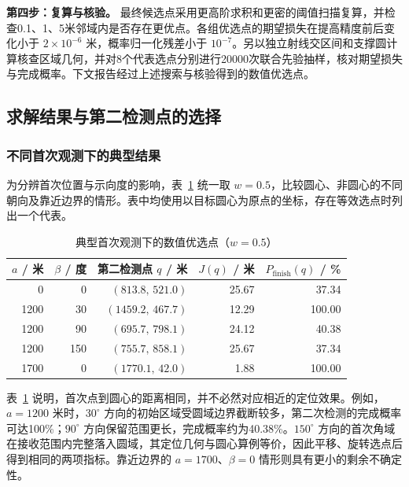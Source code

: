 \textbf{第四步：复算与核验。} 最终候选点采用更高阶求积和更密的阈值扫描复算，并检查0.1、1、5米邻域内是否存在更优点。各组优选点的期望损失在提高精度前后变化小于 \(2\times10^{-6}\) 米，概率归一化残差小于 \(10^{-7}\)。另以独立射线交区间和支撑圆计算核查区域几何，并对8个代表选点分别进行20000次联合先验抽样，核对期望损失与完成概率。下文报告经过上述搜索与核验得到的数值优选点。

\subsection{求解结果与第二检测点的选择}

\subsubsection{不同首次观测下的典型结果}

为分辨首次位置与示向度的影响，表~\ref{tab:q2-typical-results} 统一取 \(w=0.5\)，比较圆心、非圆心的不同朝向及靠近边界的情形。表中均使用以目标圆心为原点的坐标，存在等效选点时列出一个代表。

\begin{table}[htbp]
  \centering
  \caption{典型首次观测下的数值优选点（\(w=0.5\)）}
  \label{tab:q2-typical-results}
  \small
  \renewcommand{\arraystretch}{1.08}
  \begin{tabular}{rrrrr}
    \toprule
    \(a\) / 米 & \(\beta\) / 度 & 第二检测点 \(q\) / 米 & \(J(q)\) / 米 & \(P_{\mathrm{finish}}(q)\) / \% \\
    \midrule
    0 & 0 & \((813.8,\,521.0)\) & 25.67 & 37.34 \\
    1200 & 30 & \((1459.2,\,467.7)\) & 12.29 & 100.00 \\
    1200 & 90 & \((695.7,\,798.1)\) & 24.12 & 40.38 \\
    1200 & 150 & \((755.7,\,858.1)\) & 25.67 & 37.34 \\
    1700 & 0 & \((1770.1,\,42.0)\) & 1.88 & 100.00 \\
    \bottomrule
  \end{tabular}
\end{table}

表~\ref{tab:q2-typical-results} 说明，首次点到圆心的距离相同，并不必然对应相近的定位效果。例如，\(a=1200\) 米时，\(30^\circ\) 方向的初始区域受圆域边界截断较多，第二次检测的完成概率可达100\%；\(90^\circ\) 方向保留范围更长，完成概率约为40.38\%。\(150^\circ\) 方向的首次角域在接收范围内完整落入圆域，其定位几何与圆心算例等价，因此平移、旋转选点后得到相同的两项指标。靠近边界的 \(a=1700\)、\(\beta=0\) 情形则具有更小的剩余不确定性。

